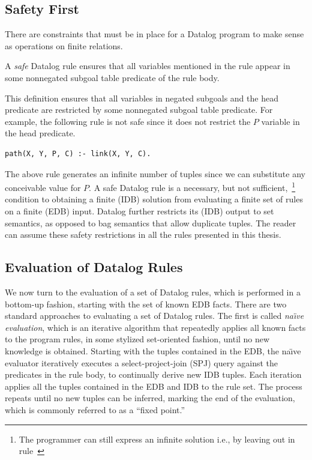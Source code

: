 \subsection{Safety First}
\label{ch:p2:sec:safety}

There are constraints that must be in place for a Datalog program to make sense
as operations on finite relations.  
\begin{mydef}
\ssp
A {\em safe} Datalog rule ensures that all variables mentioned in the rule
appear in some nonnegated subgoal table predicate of the rule body.
\end{mydef}
This definition ensures that all variables in negated subgoals and the head
predicate are restricted by some nonnegated subgoal table predicate.  For example,
the following rule is not safe since it does not restrict the $P$ variable in
the  head predicate.
\begin{lstlisting}[frame=none]
path(X, Y, P, C) :- link(X, Y, C).
\end{lstlisting}
The above rule generates an infinite number of  tuples since we can
substitute any conceivable value for $P$.  A safe Datalog rule is a necessary,
but not sufficient,~\footnote{The programmer can still express an infinite
solution i.e., by leaving out  in rule~}
condition to obtaining a finite (IDB) solution from evaluating a finite set of
rules on a finite (EDB) input.  Datalog further restricts its (IDB) output to
set semantics, as opposed to bag semantics that allow duplicate tuples.  The
reader can assume these safety restrictions in all the rules presented in this
thesis.

\subsection{Evaluation of Datalog Rules}
\label{ch:p2:sec:eval}

We now turn to the evaluation of a set of Datalog rules, which is performed in
a bottom-up fashion, starting with the set of known EDB facts.  There are two
standard approaches to evaluating a set of Datalog rules.  The first is called
{\em na\"{\i}ve evaluation}, which is an iterative algorithm that repeatedly
applies all known facts to the program rules, in some stylized set-oriented
fashion, until no new knowledge is obtained.  Starting with the tuples
contained in the EDB, the na\"{\i}ve evaluator iteratively executes a
select-project-join (SPJ) query against the predicates in the rule body, to
continually derive new IDB tuples.  Each iteration applies all the tuples
contained in the EDB and IDB to the rule set.  The process repeats until no new
tuples can be inferred, marking the end of the evaluation, which is commonly
referred to as a ``fixed point.''

